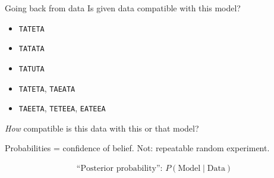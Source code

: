 \documentclass[9pt]{beamer}
\begin{document}
\begin{frame}{Going back from data}
  Is given data compatible with this model?

  \pause
  \begin{itemize}
  \item \texttt{TATETA}
  \pause
  \item \texttt{TATATA}
  \pause
  \item \texttt{TATUTA}
  \pause
  \item \texttt{TATETA}, \texttt{TAEATA}
  \pause
  \item \texttt{TAEETA}, \texttt{TETEEA}, \texttt{EATEEA}
  \end{itemize}
  \pause

  \emph{How} compatible is this data with this or that model?

  Probabilities = confidence of belief. {\small Not: repeatable random
    experiment}.

  \begin{align}
    \text{“Posterior probability”: } P(\text{Model} \mid \text{Data})
    \nonumber
  \end{align}
\end{frame}
\end{document}
